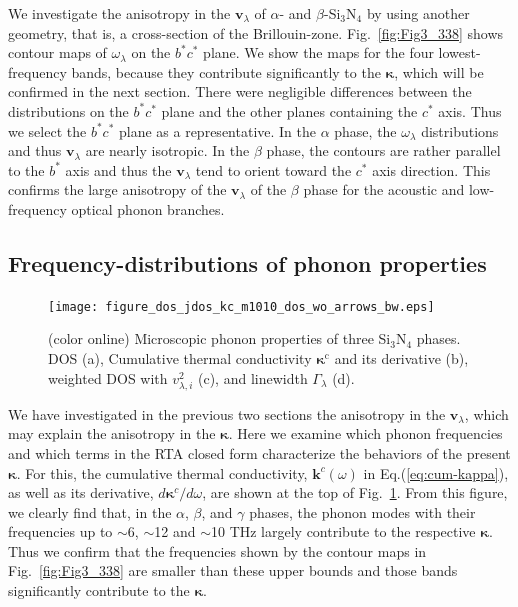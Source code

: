 \documentclass[twocolumn,amsmath,amssymb,a4paper,prb,superscriptaddress,floatfix]{revtex4-1}
\begin{document}
We investigate the anisotropy in the $\mathbf{v}_{\lambda}$ of $\alpha$- and
$\beta$-Si$_3$N$_4$ by using another geometry, that is, a cross-section of the
Brillouin-zone.  Fig.~\ref{fig:Fig3_338} shows contour maps of
$\omega_{\lambda}$  on the $b^*c^*$ plane.  We show the maps for the four
lowest-frequency bands, because they contribute significantly to the
$\boldsymbol{\kappa}$, which will be confirmed in the next section. There were
negligible differences between the distributions on the $b^*c^*$ plane and the
other planes containing the $c^*$ axis.  Thus we select the $b^*c^*$ plane as a
representative.  In the $\alpha$ phase, the $\omega_{\lambda}$ distributions and
thus $\mathbf{v}_{\lambda}$ are nearly isotropic. In the $\beta$ phase, the
contours are rather parallel to the $b^*$ axis and thus the
$\mathbf{v}_{\lambda}$ tend to orient toward the $c^*$ axis direction. This
confirms the large anisotropy of the $\mathbf{v}_{\lambda}$ of the $\beta$ phase
for the acoustic and low-frequency optical phonon branches.

\subsection{Frequency-distributions of phonon properties}

\begin{figure}[ht]
 \begin{center}
	 \texttt{[image: figure\_dos\_jdos\_kc\_m1010\_dos\_wo\_arrows\_bw.eps]}
  \caption{(color online) Microscopic phonon properties of three Si$_3$N$_4$
	  phases. DOS (a), Cumulative thermal conductivity $\mathbf{\kappa}^\text{c}$ and its derivative
	  (b), weighted DOS with $v_{\lambda,i}^2$ (c), and linewidth $\Gamma_\lambda$ (d).
  \label{fig:Fig5_338_rev} }
 \end{center}
\end{figure}

We have investigated in the previous two sections the anisotropy in the
$\mathbf{v}_\lambda$, which may explain the anisotropy in the
$\boldsymbol{\kappa}$. Here we examine which phonon frequencies and which terms
in the RTA closed form characterize the behaviors of the present  $\boldsymbol{\kappa}$.
For this, the cumulative thermal conductivity,  $\boldsymbol{k}^c(\omega)$ in
Eq.(\ref{eq:cum-kappa}), as well as its derivative,
$d\boldsymbol{\kappa}^c/d\omega$, are shown at the top of
Fig.~\ref{fig:Fig5_338_rev}.  From this figure, we clearly find that, in the
$\alpha$, $\beta$, and $\gamma$ phases, the phonon modes with their frequencies
up to $\sim$6, $\sim$12 and $\sim$10 THz largely contribute to the respective
$\boldsymbol{\kappa}$. Thus we confirm that the frequencies shown by the contour
maps in Fig.~\ref{fig:Fig3_338} are smaller than these upper bounds and those
bands significantly contribute to the $\boldsymbol{\kappa}$.  
\end{document}
